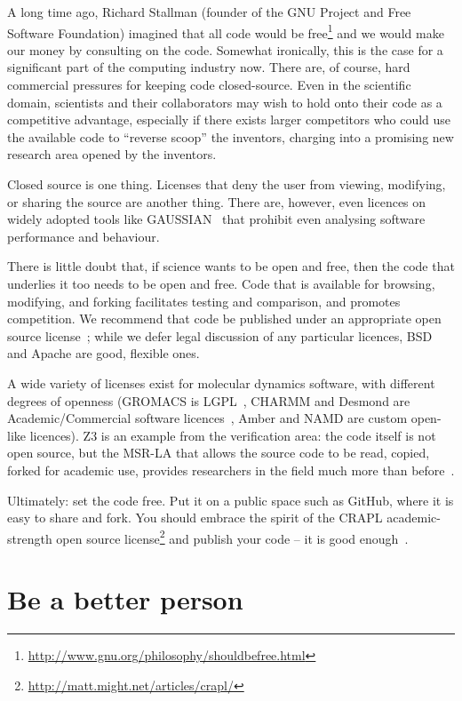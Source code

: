 \documentclass[conference]{IEEEtran}
\begin{document}
A long time ago, Richard Stallman (founder of the GNU Project and Free
Software Foundation) imagined that all code would be
free\footnote{\url{http://www.gnu.org/philosophy/shouldbefree.html}}
and we would make our money by consulting on the code.  Somewhat
ironically, this is the case for a significant part of the computing
industry now. There are, of course, hard commercial pressures for
keeping code closed-source. Even in the scientific domain, scientists
and their collaborators may wish to hold onto their code as a
competitive advantage, especially if there exists larger competitors
who could use the available code to ``reverse scoop'' the inventors,
charging into a promising new research area opened by the inventors.

Closed source is one thing. Licenses that deny the user from viewing,
modifying, or sharing the source are another thing. There are, however, even
licences on widely adopted tools like GAUSSIAN~\cite{Giles2004} that
prohibit even analysing software performance and behaviour.
 
There is little doubt that, if science wants to be open and free, then
the code that underlies it too needs to be open and free. Code that is
available for browsing, modifying, and forking facilitates testing and
comparison, and promotes competition. We recommend that code be
published under an appropriate open source license~\cite{osl}; while
we defer legal discussion of any particular licences, BSD and Apache
are good, flexible ones.

A wide variety of licenses exist for molecular dynamics software, with
different degrees of openness (GROMACS is LGPL~\cite{Hess2008},
CHARMM and Desmond are Academic/Commercial software
licences~\cite{Brooks2009,Bowers2006}, Amber and NAMD are custom
open-like licences). Z3 is an example from the verification area: the
code itself is not open source, but the MSR-LA that allows the source
code to be read, copied, forked for academic use, provides researchers
in the field much more than before~\cite{deMoura2012Z3open}.

Ultimately: set the code free. Put it on a public space such as GitHub, where it
is easy to share and fork. You should embrace the spirit of the CRAPL
academic-strength open source
license\footnote{\url{http://matt.might.net/articles/crapl/}} and
publish your code -- it is good enough~\cite{barnes:2010}.


\section{Be a better person}
\end{document}
